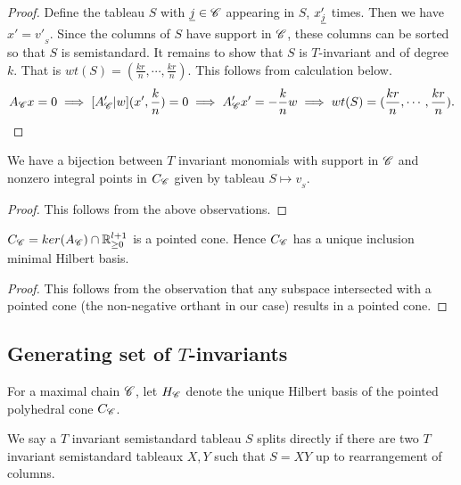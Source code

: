     \begin{proof}
        Define the tableau \(S\) with \(\underline{j} \in \mathscr{C}\) appearing in \(S\),  \(x'_{\underline{j}}\) times.
        Then we have \(x' = v'_{_S}\).
        Since the columns of \(S\) have support in $\mathscr{C}$, these columns can be sorted so that \(S\) is semistandard.
        It remains to show that \(S\) is \(T\)-invariant and of degree \(k\). 
        That is \(wt(S) = (\frac{kr}{n},\cdots,\frac{kr}{n})\).
        This follows from calculation below.
        \[
            A_{\mathscr{C}}x = 0
            \implies [A'_{\mathscr{C}}|w](x',\frac{k}{n}) = 0
            \implies A'_{\mathscr{C}}x' = -\frac{k}{n}w
            \implies wt(S) = (\frac{kr}{n},\cdots,\frac{kr}{n}).
        \]
    \end{proof}

\begin{corollary}
\label{cor:inv-cone}
We have a bijection between \(T\) invariant monomials with support in \(\mathscr{C}\) and nonzero integral points in \(C_{\mathscr{C}}\) given by tableau \(S \mapsto v_{_S}\). 
\end{corollary}
\begin{proof}
   This follows from the above observations.
\end{proof}
\begin{corollary}
\label{cor:Hilb}
$C_{\mathscr{C}} = ker(A_{\mathscr{C}}) \cap {\mathbb R}_{\ge0}^{l+1}$ is a pointed cone. Hence $C_{\mathscr{C}}$ has a unique inclusion minimal Hilbert basis.
\end{corollary}
\begin{proof}
   This follows from the observation that any subspace intersected with a pointed cone (the non-negative orthant in our case) results in a pointed cone.
\end{proof}

\subsection{Generating set of $T$-invariants}
For a maximal chain $\mathscr{C}$, let $H_{\mathscr{C}}$ denote the unique Hilbert basis of the pointed polyhedral cone  \(C_{\mathscr{C}}\).

\begin{definition}
    We say a \(T\) invariant semistandard tableau \(S\) splits directly 
    if there are two \(T\) invariant semistandard tableaux \(X,Y\) such that \(S=XY\) up to rearrangement of columns. 
\end{definition}

